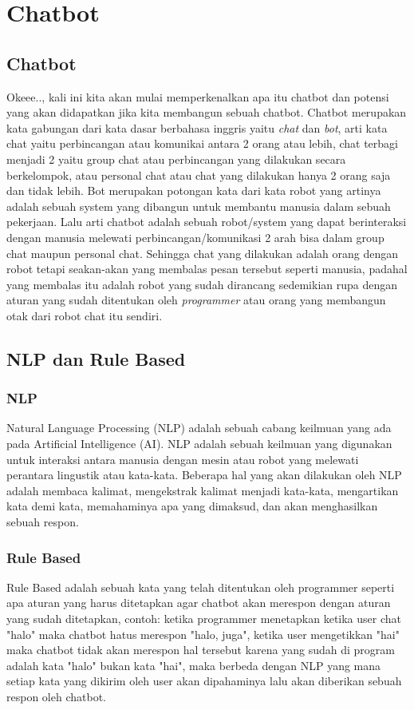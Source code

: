\section{Chatbot}

\subsection{Chatbot}
Okeee.., kali ini kita akan mulai memperkenalkan apa itu chatbot dan potensi yang akan didapatkan jika kita membangun sebuah chatbot. Chatbot merupakan kata gabungan dari kata dasar berbahasa inggris yaitu \textit{chat} dan \textit{bot}, arti kata chat yaitu perbincangan atau komunikai antara 2 orang atau lebih, chat terbagi menjadi 2 yaitu group chat atau perbincangan yang dilakukan secara berkelompok, atau personal chat atau chat yang dilakukan hanya 2 orang saja dan tidak lebih. Bot merupakan potongan kata dari kata robot yang artinya adalah sebuah system yang dibangun untuk membantu manusia dalam sebuah pekerjaan. Lalu arti chatbot adalah sebuah robot/system yang dapat berinteraksi dengan manusia melewati perbincangan/komunikasi 2 arah bisa dalam group chat maupun personal chat. Sehingga chat yang dilakukan adalah orang dengan robot tetapi seakan-akan yang membalas pesan tersebut seperti manusia, padahal yang membalas itu adalah robot yang sudah dirancang sedemikian rupa dengan aturan yang sudah ditentukan oleh \textit{programmer} atau orang yang membangun otak dari robot chat itu sendiri.

\subsection{NLP dan Rule Based}

\subsubsection{NLP}
Natural Language Processing (NLP) adalah sebuah cabang keilmuan yang ada pada Artificial Intelligence (AI). NLP adalah sebuah keilmuan yang digunakan untuk interaksi antara manusia dengan mesin atau robot yang melewati perantara lingustik atau kata-kata. Beberapa hal yang akan dilakukan oleh NLP adalah membaca kalimat, mengekstrak kalimat menjadi kata-kata, mengartikan kata demi kata, memahaminya apa yang dimaksud, dan akan menghasilkan sebuah respon.

\subsubsection{Rule Based}
Rule Based adalah sebuah kata yang telah ditentukan oleh programmer seperti apa aturan yang harus ditetapkan agar chatbot akan merespon dengan aturan yang sudah ditetapkan, contoh: ketika programmer menetapkan ketika user chat "halo" maka chatbot hatus merespon "halo, juga", ketika user mengetikkan "hai" maka chatbot tidak akan merespon hal tersebut karena yang sudah di program adalah kata "halo" bukan kata "hai", maka berbeda dengan NLP yang mana setiap kata yang dikirim oleh user akan dipahaminya lalu akan diberikan sebuah respon oleh chatbot.